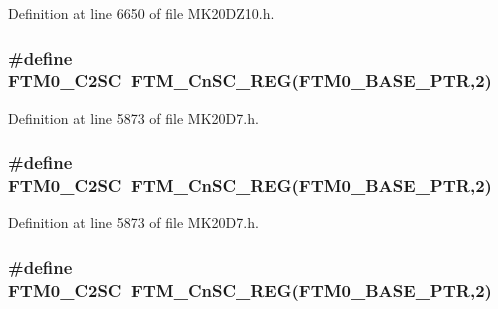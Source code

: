 Definition at line 6650 of file M\+K20\+D\+Z10.\+h.

\subsubsection[{\texorpdfstring{F\+T\+M0\+\_\+\+C2\+SC}{FTM0_C2SC}}]{\setlength{\rightskip}{0pt plus 5cm}\#define F\+T\+M0\+\_\+\+C2\+SC~{\bf F\+T\+M\+\_\+\+Cn\+S\+C\+\_\+\+R\+EG}({\bf F\+T\+M0\+\_\+\+B\+A\+S\+E\+\_\+\+P\+TR},2)}\hypertarget{group___f_t_m___register___accessor___macros_ga50d2809cd0661a10da3ac7a99656da48}{}\label{group___f_t_m___register___accessor___macros_ga50d2809cd0661a10da3ac7a99656da48}


Definition at line 5873 of file M\+K20\+D7.\+h.

\subsubsection[{\texorpdfstring{F\+T\+M0\+\_\+\+C2\+SC}{FTM0_C2SC}}]{\setlength{\rightskip}{0pt plus 5cm}\#define F\+T\+M0\+\_\+\+C2\+SC~{\bf F\+T\+M\+\_\+\+Cn\+S\+C\+\_\+\+R\+EG}({\bf F\+T\+M0\+\_\+\+B\+A\+S\+E\+\_\+\+P\+TR},2)}\hypertarget{group___f_t_m___register___accessor___macros_ga50d2809cd0661a10da3ac7a99656da48}{}\label{group___f_t_m___register___accessor___macros_ga50d2809cd0661a10da3ac7a99656da48}


Definition at line 5873 of file M\+K20\+D7.\+h.

\subsubsection[{\texorpdfstring{F\+T\+M0\+\_\+\+C2\+SC}{FTM0_C2SC}}]{\setlength{\rightskip}{0pt plus 5cm}\#define F\+T\+M0\+\_\+\+C2\+SC~{\bf F\+T\+M\+\_\+\+Cn\+S\+C\+\_\+\+R\+EG}({\bf F\+T\+M0\+\_\+\+B\+A\+S\+E\+\_\+\+P\+TR},2)}\hypertarget{group___f_t_m___register___accessor___macros_ga50d2809cd0661a10da3ac7a99656da48}{}\label{group___f_t_m___register___accessor___macros_ga50d2809cd0661a10da3ac7a99656da48}


